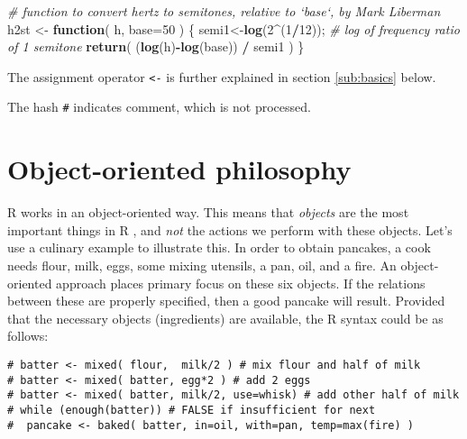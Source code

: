 \documentclass[]{book}
\newenvironment{Shaded}{\begin{snugshade}}{\end{snugshade}}
\newcommand{\CommentTok}[1]{\textcolor[rgb]{0.56,0.35,0.01}{\textit{#1}}}
\newcommand{\ControlFlowTok}[1]{\textcolor[rgb]{0.13,0.29,0.53}{\textbf{#1}}}
\newcommand{\DataTypeTok}[1]{\textcolor[rgb]{0.13,0.29,0.53}{#1}}
\newcommand{\DecValTok}[1]{\textcolor[rgb]{0.00,0.00,0.81}{#1}}
\newcommand{\KeywordTok}[1]{\textcolor[rgb]{0.13,0.29,0.53}{\textbf{#1}}}
\newcommand{\NormalTok}[1]{#1}
\newcommand{\OperatorTok}[1]{\textcolor[rgb]{0.81,0.36,0.00}{\textbf{#1}}}
\newcommand{\StringTok}[1]{\textcolor[rgb]{0.31,0.60,0.02}{#1}}
\begin{document}
\begin{Shaded}
\begin{Highlighting}[]
\CommentTok{# function to convert hertz to semitones, relative to `base`, by Mark Liberman}
\NormalTok{h2st <-}\StringTok{ }\ControlFlowTok{function}\NormalTok{( h, }\DataTypeTok{base=}\DecValTok{50}\NormalTok{ ) \{ }
\NormalTok{  semi1<-}\KeywordTok{log}\NormalTok{(}\DecValTok{2}\OperatorTok{^}\NormalTok{(}\DecValTok{1}\OperatorTok{/}\DecValTok{12}\NormalTok{)); }\CommentTok{# log of frequency ratio of 1 semitone}
  \KeywordTok{return}\NormalTok{( (}\KeywordTok{log}\NormalTok{(h)}\OperatorTok{-}\KeywordTok{log}\NormalTok{(base)) }\OperatorTok{/}\StringTok{ }\NormalTok{semi1 ) \}}
\end{Highlighting}
\end{Shaded}

The assignment operator \texttt{\textless{}-}
is further explained in section \ref{sub:basics} below.

The hash \texttt{\#} indicates comment, which is not processed.

\hypertarget{sec:objectorientedphilosophy}{%
\section{Object-oriented philosophy}\label{sec:objectorientedphilosophy}}

R works in an object-oriented way. This means that
\emph{objects} are the most important things in R , and \emph{not}
the actions we perform with these objects. Let's use a culinary example
to illustrate this. In order to obtain pancakes, a cook needs flour,
milk, eggs, some mixing utensils, a pan, oil, and a fire. An
object-oriented approach places primary focus on these six objects. If
the relations between these are properly specified, then a good pancake
will result. Provided that the necessary objects (ingredients) are
available, the R syntax could be as follows:

\begin{verbatim}
# batter <- mixed( flour,  milk/2 ) # mix flour and half of milk
# batter <- mixed( batter, egg*2 ) # add 2 eggs
# batter <- mixed( batter, milk/2, use=whisk) # add other half of milk
# while (enough(batter)) # FALSE if insufficient for next
#  pancake <- baked( batter, in=oil, with=pan, temp=max(fire) )
\end{verbatim}
\end{document}

